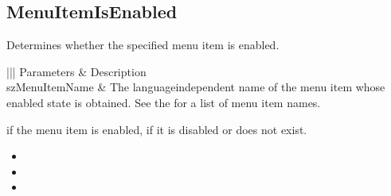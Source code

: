 \documentclass[letterpaper,12pt,english,openany,oneside]{sphinxmanual}
\begin{document}
\subsection{MenuItemIsEnabled}
\label{\detokenize{IAC_API_OLE_Objects:menuitemisenabled}}
Determines whether the specified menu item is enabled.


\begin{sphinxVerbatim}[commandchars=\\\{\}]
  
\end{sphinxVerbatim}
\label{\detokenize{IAC_API_OLE_Objects:parameters-8}}


\begin{savenotes}\sphinxattablestart
\centering
{}\label{\detokenize{IAC_API_OLE_Objects:section-10}}\nobreak
\begin{tabular}[t]{|||}
\hline
\sphinxstyletheadfamily 
Parameters
&\sphinxstyletheadfamily 
Description
\\
\hline
szMenuItemName
&
The language\sphinxhyphen{}independent name of the menu item whose enabled state is obtained. See the  for a list of menu item names.
\\
\hline
\end{tabular}
\par
\sphinxattableend\end{savenotes}


 if the menu item is enabled,  if it is disabled or does not exist.

\label{\detokenize{IAC_API_OLE_Objects:related-methods-15}}
\begin{itemize}
\item {} 
 

\item {} 
 

\item {} 
 

\end{itemize}
\end{document}
